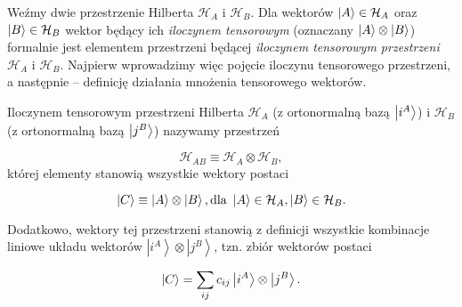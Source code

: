 Weźmy dwie przestrzenie Hilberta $\mathcal{H}_{A}$ i $\mathcal{H}_{B}$. Dla wektorów $\ket{A} \in \mathcal{H}_{A}$ oraz $\ket{B} \in \mathcal{H}_{B}$ wektor będący ich \textit{iloczynem tensorowym} (oznaczany $\ket{A} \otimes \ket{B}$) formalnie jest elementem przestrzeni będącej \textit{iloczynem tensorowym przestrzeni} $\mathcal{H}_{A}$ i $\mathcal{H}_{B}$. Najpierw wprowadzimy więc pojęcie iloczynu tensorowego przestrzeni, a następnie -- definicję działania mnożenia tensorowego wektorów.

\begin{definition}
    Iloczynem tensorowym przestrzeni Hilberta $\mathcal{H}_A$ (z ortonormalną bazą $\ket{i^{A}}$) i $\mathcal{H}_B$ (z ortonormalną bazą $\ket{j^{B}}$) nazywamy przestrzeń

    $$
        \mathcal{H}_{AB} \equiv \mathcal{H}_A \otimes \mathcal{H}_B,
    $$
    której elementy stanowią wszystkie wektory postaci

    \begin{equation}
        \label{equation:product}
        \ket{C} \equiv \ket{A} \otimes \ket{B}, \text{dla } \ket{A} \in \mathcal{H}_A, \ket{B} \in \mathcal{H}_B.
    \end{equation}

    Dodatkowo, wektory tej przestrzeni stanowią z definicji wszystkie kombinacje liniowe układu wektorów $\left|i^{A}\right\rangle\otimes\left|j^{B}\right\rangle$, tzn. zbiór wektorów postaci

    \begin{equation}
        \label{equation:entangled}
        \ket{C} = \sum\limits_{ij} c_{ij} \ket{i ^ {A}} \otimes \ket{j ^ {B}}.
    \end{equation}
\end{definition}

